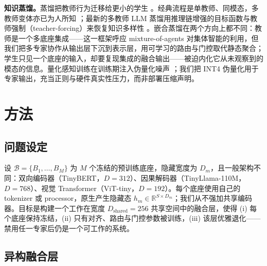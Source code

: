 \documentclass[10pt,twoside]{article}
\newcommand{\R}{\mathbb{R}}
\begin{document}
\textbf{知识蒸馏。}蒸馏把教师行为迁移给更小的学生 \citep{hintonDistillingKnowledgeNeural2015,sanh2019,gou2021}。经典流程是单教师、同模态，多教师变体亦已为人所知 \citep{you2017}；最新的多教师 LLM 蒸馏用推理链增强的目标函数与教师强制（teacher-forcing）来恢复知识多样性 \citep{tian2025tinyllm}。嵌合蒸馏在两个方向上都不同：教师是一个多底座集成——这一框架呼应 mixture-of-agents \citep{wang2024moa} 对集体智能的利用，但我们把多专家协作从输出层下沉到表示层，用可学习的路由与门控取代静态聚合；学生只见一个底座的输入，却要复现集成的融合输出——被迫内化它从未观察到的模态的信息。量化感知训练在训练期注入伪量化噪声 \citep{dettmers2022}；我们把 INT4 伪量化用于专家输出，充当正则与硬件真实性压力，而非部署压缩声明。

\section{方法}
\label{sec:method}

\subsection{问题设定}
\label{sec:setup}

设 $\mathcal{B} = \{B_1, \dots, B_M\}$ 为 $M$ 个冻结的预训练底座，隐藏宽度为 $D_m$，且一般架构不同：双向编码器（TinyBERT，$D{=}312$）\citep{jiao2020,devlin2019}、因果解码器（TinyLlama-110M，$D{=}768$）、视觉 Transformer（ViT-tiny，$D{=}192$）\citep{dosovitskiy2021}。每个底座使用自己的 tokenizer 或 processor，原生产生隐藏态 $h_m \in \R^{S \times D_m}$；我们从不强加共享编码器。目标是构建一个工作在宽度 $D_{\text{shared}} = 256$ 共享空间中的融合层，使得 (i) 每个底座保持冻结，(ii) 只有对齐、路由与门控参数被训练，(iii) 该层优雅退化——禁用任一专家后仍是一个可工作的系统。

\subsection{异构融合层}
\label{sec:layer}
\end{document}
